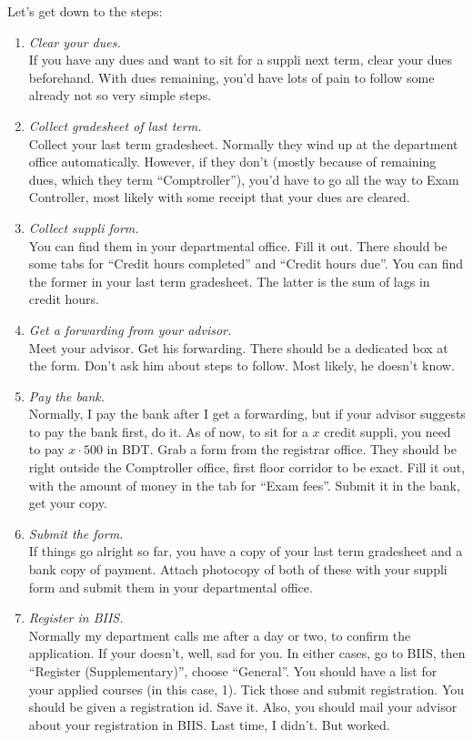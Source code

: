 \documentclass[]{article}
\begin{document}
	Let's get down to the steps:
	\begin{enumerate}
		\item \textit{Clear your dues.} \\ If you have any dues and want to sit for a suppli next term, clear your dues beforehand. With dues remaining, you'd have lots of pain to follow some already not so very simple steps.
		\item \textit{Collect gradesheet of last term.} \\ Collect your last term gradesheet. Normally they wind up at the department office automatically. However, if they don't (mostly because of remaining dues, which they term ``Comptroller''), you'd have to go all the way to Exam Controller, most likely with some receipt that your dues are cleared.
		\item \textit{Collect suppli form.} \\ You can find them in your departmental office. Fill it out. There should be some tabs for ``Credit hours completed'' and ``Credit hours due''. You can find the former in your last term gradesheet. The latter is the sum of lags in credit hours.
		\item \textit{Get a forwarding from your advisor.} \\ Meet your advisor. Get his forwarding. There should be a dedicated box at the form. Don't ask him about steps to follow. Most likely, he doesn't know.
		\item \textit{Pay the bank.} \\ Normally, I pay the bank after I get a forwarding, but if your advisor suggests to pay the bank first, do it. As of now, to sit for a $x$ credit suppli, you need to pay $x \cdot 500$ in BDT. Grab a form from the registrar office. They should be right outside the Comptroller office, first floor corridor to be exact. Fill it out, with the amount of money in the tab for ``Exam fees''. Submit it in the bank, get your copy.
		\item \textit{Submit the form.} \\ If things go alright so far, you have a copy of your last term gradesheet and a bank copy of payment. Attach photocopy of both of these with your suppli form and submit them in your departmental office.
		\item \textit{Register in BIIS.} \\ Normally my department calls me after a day or two, to confirm the application. If your doesn't, well, sad for you. In either cases, go to BIIS, then ``Register (Supplementary)'', choose ``General''. You should have a list for your applied courses (in this case, 1). Tick those and submit registration. You should be given a registration id. Save it. Also, you should mail your advisor about your registration in BIIS. Last time, I didn't. But worked.
	\end{enumerate}
\end{document}
